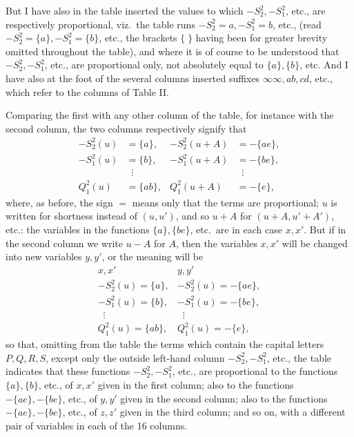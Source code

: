 \documentclass[11pt,a4paper]{article}
\begin{document}
\newpage


\noindent But I have also in the table inserted the values to which $-S_{2}^{2}, -S_{1}^{2}$, etc., are respectively proportional, viz.\ the table runs $-S_{2}^{2} = a, -S_{1}^{2} = b$, etc., (read $-S_{2}^{2} = \{a\}, -S_{1}^{2} = \{b\}$, etc., the brackets $\{\;\}$ having been for greater brevity omitted throughout the table), and where it is of course to be understood that $-S_{2}^{2}, -S_{1}^{2}$, etc., are proportional only, not absolutely equal to $\{a\}, \{b\}$, etc. And I have also at the foot of the several columns inserted suffixes $\infty\infty, ab, cd$, etc., which refer to the columns of Table II.

\medskip

Comparing the first with any other column of the table, for instance with the second column, the two columns respectively signify that
\[
\begin{aligned}
-S_{2}^{2}(u) &= \{a\}, & -S_{2}^{2}(u + A) &= -\{ae\},\\
-S_{1}^{2}(u) &= \{b\}, & -S_{1}^{2}(u + A) &= -\{be\},\\
&\;\;\vdots & &\;\;\vdots\\
Q_{1}^{2}(u) &= \{ab\}, & Q_{1}^{2}(u + A) &= -\{e\},
\end{aligned}
\]
where, as before, the sign $=$ means only that the terms are proportional; $u$ is written for shortness instead of $(u, u')$, and so $u + A$ for $(u + A, u' + A')$, etc.: the variables in the functions $\{a\}, \{be\}$, etc.\ are in each case $x, x'$. But if in the second column we write $u - A$ for $A$, then the variables $x, x'$ will be changed into new variables $y, y'$, or the meaning will be
\[
\begin{array}{ll}
x, x' & y, y'\\
-S_{2}^{2}(u) = \{a\}, & -S_{2}^{2}(u) = -\{ae\},\\
-S_{1}^{2}(u) = \{b\}, & -S_{1}^{2}(u) = -\{be\},\\
\;\;\vdots & \;\;\vdots\\
Q_{1}^{2}(u) = \{ab\}, & Q_{1}^{2}(u) = -\{e\},
\end{array}
\]
so that, omitting from the table the terms which contain the capital letters $P, Q, R, S$, except only the outside left-hand column $-S_{2}^{2}, -S_{1}^{2}$, etc., the table indicates that these functions $-S_{2}^{2}, -S_{1}^{2}$, etc., are proportional to the functions $\{a\}, \{b\}$, etc., of $x, x'$ given in the first column; also to the functions $-\{ae\}, -\{be\}$, etc., of $y, y'$ given in the second column; also to the functions $-\{ae\}, -\{be\}$, etc., of $z, z'$ given in the third column; and so on, with a different pair of variables in each of the 16 columns.
\end{document}
